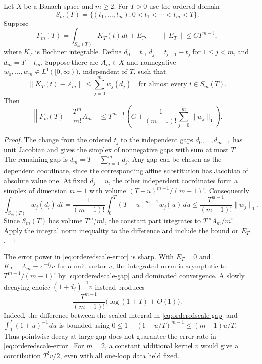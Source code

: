 \begin{proposition}
\label{prop:orderedscales}
Let $X$ be a Banach space and $m\ge2$. For $T>0$ use the ordered domain
\[
 S_m(T)=\{(t_1,\ldots,t_m):0<t_1<\cdots<t_m<T\}.
\]
Suppose
\[
 F_m(T)=\int_{S_m(T)}K_T(t)\,dt+E_T,\qquad
 \|E_T\|\le C T^{m-1},
\]
where $K_T$ is Bochner integrable. Define $d_0=t_1$,
$d_j=t_{j+1}-t_j$ for $1\le j<m$, and $d_m=T-t_m$.
Suppose there are $A_m\in X$ and nonnegative
$w_0,\ldots,w_m\in L^1([0,\infty))$, independent of $T$, such that
\[
 \|K_T(t)-A_m\|\le\sum_{j=0}^m w_j(d_j)
 \quad\text{for almost every }t\in S_m(T).
\]
Then
\begin{equation}
 \left\|F_m(T)-\frac{T^m}{m!}A_m\right\|
 \le T^{m-1}\left(C+\frac1{(m-1)!}\sum_{j=0}^m\|w_j\|_1\right).
 \label{eq:orderedscale-error}
\end{equation}
\end{proposition}
\begin{proof}
The change from the ordered $t_j$ to the independent gaps
$d_0,\ldots,d_{m-1}$ has unit Jacobian and gives the simplex
of nonnegative gaps with sum at most $T$. The remaining gap
is $d_m=T-\sum_{j=0}^{m-1}d_j$. Any gap can be chosen as the
dependent coordinate, since the corresponding affine
substitution has Jacobian of absolute value one. At fixed
$d_j=u$, the other independent coordinates form a simplex
of dimension $m-1$ with volume $(T-u)^{m-1}/(m-1)!$.
Consequently
\begin{equation}
 \int_{S_m(T)}w_j(d_j)\,dt=
 \frac1{(m-1)!}\int_0^T (T-u)^{m-1}w_j(u)\,du
 \le\frac{T^{m-1}}{(m-1)!}\|w_j\|_1 .
 \label{eq:orderedscale-gap}
\end{equation}
Since $S_m(T)$ has volume $T^m/m!$, the constant part
integrates to $T^m A_m/m!$. Apply the integral norm
inequality to the difference and include the bound on $E_T$.
\end{proof}

The error power in \eqref{eq:orderedscale-error} is sharp.
With $E_T=0$ and $K_T-A_m=e^{-d_j}v$ for a unit vector $v$,
the integrated norm is asymptotic to $T^{m-1}/(m-1)!$ by
\eqref{eq:orderedscale-gap} and dominated convergence.
A slowly decaying choice $(1+d_j)^{-1}v$ instead produces
\[
 \frac{T^{m-1}}{(m-1)!}\big(\log(1+T)+O(1)\big).
\]
Indeed, the difference between the scaled integral in
\eqref{eq:orderedscale-gap} and $\int_0^T (1+u)^{-1}\,du$
is bounded using $0\le1-(1-u/T)^{m-1}\le (m-1)u/T$.
Thus pointwise decay at large gap does not guarantee the
error rate in \eqref{eq:orderedscale-error}. For $m=2$, a
constant additional kernel $v$ would give a contribution
$T^2v/2$, even with all one-loop data held fixed.

